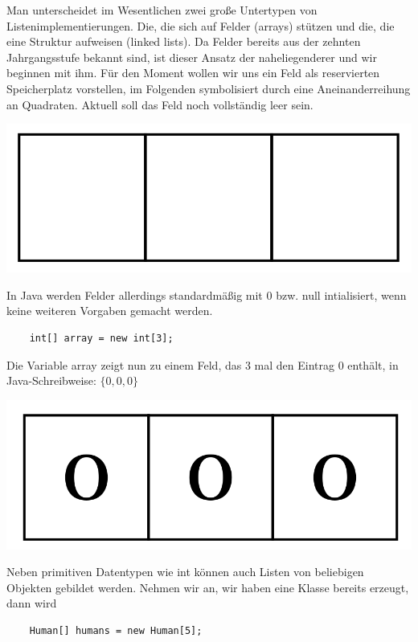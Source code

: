 \documentclass{article}
\begin{document}
Man unterscheidet im Wesentlichen zwei große Untertypen von Listenimplementierungen. Die, die sich auf Felder (arrays) stützen und
die, die eine  Struktur aufweisen (linked lists). Da Felder bereits aus der zehnten Jahrgangsstufe bekannt sind, ist dieser Ansatz der naheliegenderer und wir beginnen mit ihm. 
Für den Moment wollen wir uns ein Feld als reservierten Speicherplatz vorstellen, im Folgenden symbolisiert durch
eine Aneinanderreihung an Quadraten. Aktuell soll das Feld noch vollständig leer sein.
\begin{center}
    \includegraphics[scale=0.15]{../media/empty_arr.png}
\end{center}
In Java werden Felder allerdings standardmäßig mit 0 bzw. null intialisiert, wenn keine weiteren Vorgaben gemacht werden.
\bsp
\begin{verbatim}
    int[] array = new int[3];
\end{verbatim}
Die Variable array zeigt nun zu einem Feld, das 3 mal den Eintrag 0 enthält, 
in Java-Schreibweise: $\{0,0,0\}$ \\

\begin{center}
    \includegraphics[scale = 0.15]{../media/zero_arr.png}
\end{center} 

Neben primitiven Datentypen wie int können auch Listen von beliebigen Objekten gebildet werden. Nehmen wir an, wir haben
eine Klasse bereits erzeugt, dann wird

\begin{verbatim}
    Human[] humans = new Human[5];
\end{verbatim}
\end{document}
